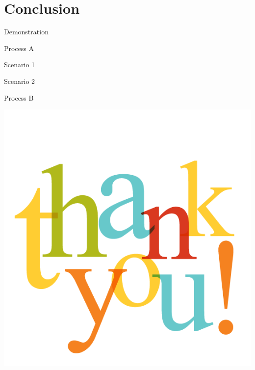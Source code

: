 \documentclass{beamer}
\begin{document}
\section{Conclusion}


			
\begin{frame}{Demonstration}
	\begin{block}{Process A}
	\end{block}
	\begin{block}{Scenario 1}
	\end{block}
	\begin{alertblock}{Scenario 2}
	\end{alertblock}
	\begin{block}{Process B}
	\end{block}
	\note{}
\end{frame}
											 			
\begin{frame}
	\centering
	\includegraphics[width=.7\linewidth]{thankyou}
	\note{}
\end{frame}
					
\end{document}
